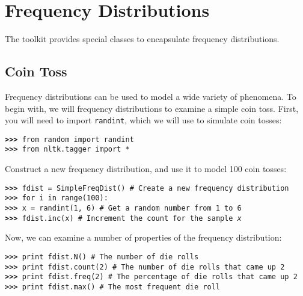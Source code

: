 \documentclass[11pt]{article}
\begin{document}
\section{Frequency Distributions}

The toolkit provides special classes to encapsulate frequency
distributions.

\subsection{Coin Toss}

Frequency distributions can be used to model a wide variety of
phenomena.  To begin with, we will frequency distributions to examine
a simple coin toss.  First, you will need to import \texttt{randint},
which we will use to simulate coin tosses:

\noindent\begin{tabbing}
\tt\textbf{>>>} from random import randint \\
\tt\textbf{>>>} from nltk.tagger import *
\end{tabbing}

Construct a new frequency distribution, and use it to model 100 coin
tosses: 

\noindent\begin{tabbing}
\tt\textbf{>>>} fdist = SimpleFreqDist()
    \qquad\qquad\qquad
    \= \textrm{\# Create a new frequency distribution} \\
\tt\textbf{>>>} for i in range(100):\\
\tt\textbf{>>>} \qquad x = randint(1, 6)
    \>\textrm{\# Get a random number from 1 to 6} \\
\tt\textbf{>>>} \qquad fdist.inc(x)
    \>\textrm{\# Increment the count for the sample \textit{x}} \\
\end{tabbing}

\noindent
Now, we can examine a number of properties of the frequency
distribution: 

\noindent\begin{tabbing}
\tt\textbf{>>>} print fdist.N()
    \qquad\qquad\qquad\qquad
    \=\textrm{\# The number of die rolls} \\
\tt\textbf{>>>} print fdist.count(2)
    \>\textrm{\# The number of die rolls that came up 2} \\
\tt\textbf{>>>} print fdist.freq(2)
    \>\textrm{\# The percentage of die rolls that came up 2} \\
\tt\textbf{>>>} print fdist.max()
    \>\textrm{\# The most frequent die roll} \\
\end{tabbing}
\end{document}

